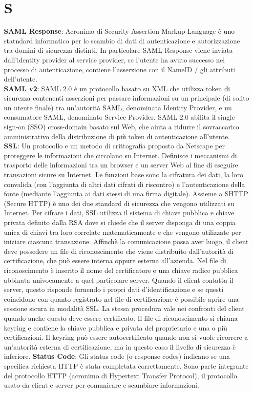 \section{S}
\textbf{SAML Response}: Acronimo di Security Assertion Markup Language è uno statndard informatico per lo scambio di dati di autenticazione e autorizzazione tra domini di sicurezza distinti. In particolare SAML Response viene inviata dall'identity provider al service provider, se l'utente ha avuto successo nel processo di autenticazione, contiene l'asserzione con il NameID / gli attributi dell'utente.\\
\textbf{SAML v2}: SAML 2.0 è un protocollo basato su XML che utilizza token di sicurezza contenenti asserzioni per passare informazioni su un principale (di solito un utente finale) tra un'autorità SAML, denominata Identity Provider, e un consumatore SAML, denominato Service Provider. SAML 2.0 abilita il single sign-on (SSO) cross-domain basato sul Web, che aiuta a ridurre il sovraccarico amministrativo della distribuzione di più token di autenticazione all'utente.\\
\textbf{SSL}: Un protocollo e un metodo di crittografia proposto da Netscape per proteggere le informazioni che circolano su Internet. 
Definisce i meccanismi di trasporto delle informazioni tra un browser e un server Web al fine di eseguire transazioni sicure su Internet. 
Le funzioni base sono la cifratura dei dati, la loro convalida (con l'aggiunta di altri dati cifrati di riscontro) e l'autenticazione della 
fonte (mediante l'aggiunta ai dati stessi di una firma digitale). Assieme a SHTTP (Secure HTTP) è uno dei due standard di sicurezza che vengono 
utilizzati su Internet. Per cifrare i dati, SSL utilizza il sistema di chiave pubblica e chiave privata definito dalla RSA dove si chiede che il server 
disponga di una coppia unica di chiavi tra loro correlate matematicamente e che vengono utilizzate per iniziare ciascuna transazione. 
Affinchè la comunicazione possa aver luogo, il client deve possedere un file di riconoscimento che viene distribuito dall'autorità di certificazione, 
che può essere interna oppure esterna all'azienda. Nel file di riconoscimento è inserito il nome del certificatore e una chiave radice pubblica abbinata 
univocamente a quel particolare server. Quando il client contatta il server, questo risponde fornendo i propri dati d'identificazione e se questi 
coincidono con quanto registrato nel file di certificazione è possibile aprire una sessione sicura in modalità SSL. La stessa procedura vale nei 
confronti del client quando anche questo deve essere certificato. Il file di riconoscimento si chiama keyring e contiene la chiave pubblica e privata 
del proprietario e una o più certificazioni. Il keyring può essere autocertificato quando non si vuole ricorrere a un'autorità esterna di certificazione, 
ma in questo caso il livello di sicurezza è inferiore.
\textbf{Status Code}: Gli status code (o response codes) indicano se una specifica richiesta HTTP è stata completata correttamente. Sono parte integrante del protocollo HTTP (acronimo di Hypertext Transfer Protocol), il protocollo usato da client e server per comunicare e scambiare informazioni.
